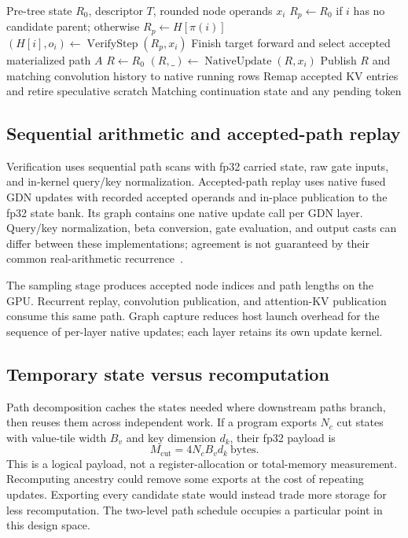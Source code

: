 \documentclass[conference]{IEEEtran}
\begin{document}
\begin{algorithm}[t]
\caption{Logical recurrence and selected-path publication. The implementation groups independent paths into GPU launches and retains only their needed cut states.}
\label{alg:scan-replay}
\begin{algorithmic}[1]
\REQUIRE Pre-tree state $R_0$, descriptor $T$, rounded node operands $x_i$
\STATE $R_p\gets R_0$ if $i$ has no candidate parent; otherwise $R_p\gets H[\pi(i)]$
\STATE $(H[i],o_i)\gets\operatorname{VerifyStep}(R_p,x_i)$
\ENDFOR
\STATE Finish target forward and select accepted materialized path $A$
\STATE $R\gets R_0$
\STATE $(R,\_)\gets\operatorname{NativeUpdate}(R,x_i)$
\ENDFOR
\STATE Publish $R$ and matching convolution history to native running rows
\STATE Remap accepted KV entries and retire speculative scratch
\RETURN Matching continuation state and any pending token
\end{algorithmic}
\end{algorithm}

\subsection{Sequential arithmetic and accepted-path replay}
Verification uses sequential path scans with fp32 carried state, raw gate inputs, and in-kernel query/key normalization. Accepted-path replay uses native fused GDN updates with recorded accepted operands and in-place publication to the fp32 state bank. Its graph contains one native update call per GDN layer. Query/key normalization, beta conversion, gate evaluation, and output casts can differ between these implementations; agreement is not guaranteed by their common real-arithmetic recurrence~\cite{lumo2026archive}.

The sampling stage produces accepted node indices and path lengths on the GPU. Recurrent replay, convolution publication, and attention-KV publication consume this same path. Graph capture reduces host launch overhead for the sequence of per-layer native updates; each layer retains its own update kernel.

\subsection{Temporary state versus recomputation}
Path decomposition caches the states needed where downstream paths branch, then reuses them across independent work. If a program exports $N_c$ cut states with value-tile width $B_v$ and key dimension $d_k$, their fp32 payload is
\begin{equation}
 M_{\mathrm{cut}}=4N_cB_vd_k\ \text{bytes}.
\end{equation}
This is a logical payload, not a register-allocation or total-memory measurement. Recomputing ancestry could remove some exports at the cost of repeating updates. Exporting every candidate state would instead trade more storage for less recomputation. The two-level path schedule occupies a particular point in this design space.
\end{document}
